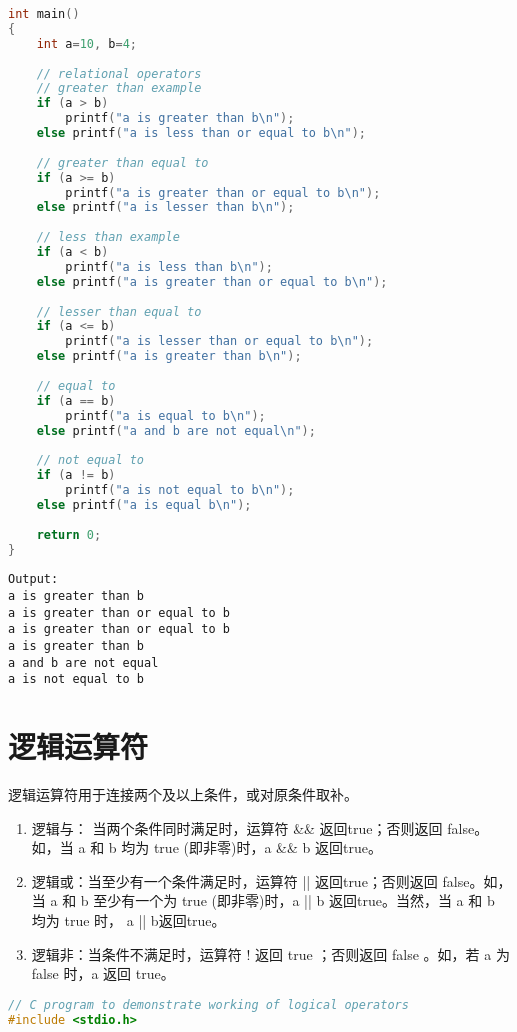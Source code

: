 \documentclass[10pt,a4paper%
tablecaptionabove]{article}
\def\tf{\ttfamily}
\begin{document}
\begin{CJK}{UTF8}{gkai}
\begin{lstlisting}[language=c,backgroundcolor=\color{red!10}]
int main()
{
    int a=10, b=4;
 
    // relational operators
    // greater than example
    if (a > b)
        printf("a is greater than b\n");
    else printf("a is less than or equal to b\n");
 
    // greater than equal to
    if (a >= b)
        printf("a is greater than or equal to b\n");
    else printf("a is lesser than b\n");
 
    // less than example
    if (a < b)
        printf("a is less than b\n");
    else printf("a is greater than or equal to b\n");
 
    // lesser than equal to
    if (a <= b)
        printf("a is lesser than or equal to b\n");
    else printf("a is greater than b\n");
 
    // equal to
    if (a == b)
        printf("a is equal to b\n");
    else printf("a and b are not equal\n");
 
    // not equal to
    if (a != b)
        printf("a is not equal to b\n");
    else printf("a is equal b\n");
 
    return 0;
}  
\end{lstlisting}

\begin{lstlisting}[backgroundcolor=\color{red!10}]
Output:
a is greater than b
a is greater than or equal to b
a is greater than or equal to b
a is greater than b
a and b are not equal
a is not equal to b  
\end{lstlisting}


\section{逻辑运算符}
逻辑运算符用于连接两个及以上条件，或对原条件取补。%

\begin{enumerate}
\item
  逻辑与： 当两个条件同时满足时，运算符 {\tf \&\&} 返回{\tf true}；否则返回 {\tf false}。如，当 {\tf a} 和 {\tf b} 均为 {\tf true} (即非零)时，{\tf a \&\& b} 返回{\tf true}。
\item
  逻辑或：当至少有一个条件满足时，运算符 {\tf ||} 返回{\tf true}；否则返回 {\tf false}。如，当 {\tf a} 和 {\tf b} 至少有一个为 {\tf true} (即非零)时，{\tf a || b} 返回{\tf true}。当然，当 {\tf a} 和 {\tf b} 均为 {\tf true} 时， {\tf a || b}返回{\tf true}。
\item
  逻辑非：当条件不满足时，运算符 {\tf !} 返回 {\tf true} ；否则返回 {\tf false} 。如，若 {\tf a} 为 {\tf false} 时，{\tf a} 返回 {\tf true}。
\end{enumerate}
\begin{lstlisting}[language=c,backgroundcolor=\color{red!10}]
// C program to demonstrate working of logical operators
#include <stdio.h>
 

\end{lstlisting}
\end{CJK}
\end{document}
